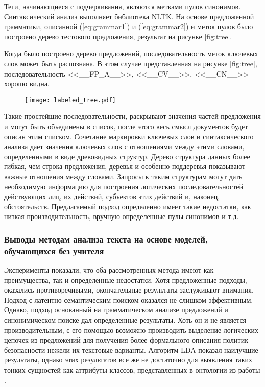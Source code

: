 \documentclass[../main]{subfiles}
\begin{document}
Теги, начинающиеся с подчеркивания, являются метками пулов синонимов. Синтаксический анализ выполняет библиотека NLTK. На основе предложенной грамматики, описанной (\ref{eq:grammar1}) и (\ref{eq:grammar2}) и меток пулов было построено дерево тестового предложения, результат на рисунке \ref{fig:tree}.

Когда было построено дерево предложений, последовательность меток ключевых слов может быть распознана. В этом случае представленная на рисунке \ref{fig:tree}, последовательность <<\_\_FP\_A\_\_>>, <<\_\_CV\_\_>>, <<\_\_CN\_\_>> хорошо видна.

\begin{figure}[H]
    \centering
    {\texttt{[image: labeled\_tree.pdf]}}
    \vspace{-\baselineskip}
\end{figure}

Такие простейшие последовательности, раскрывают значения частей предложения и могут быть объединены в список, после этого весь смысл документов будет описан этим списком. Сочетание маркировки ключевых слов и синтаксического анализа дает значения ключевых слов с отношениями между этими словами, определенными в виде древовидных структур. Дерево структура данных более гибкая, чем строка предложения, деревья и особенно поддеревья показывают важные отношения между словами. Запросы к таким структурам могут дать необходимую информацию для построения логических последовательностей действующих лиц, их действий, субъектов этих действий и, наконец, обстоятельств. Предлагаемый подход определенно имеет такие недостатки, как низкая производительность, вручную определенные пулы синонимов и т.д.

\subsubsection{Выводы методам анализа текста на основе моделей, обучающихся без учителя}

Эксперименты показали, что оба рассмотренных метода имеют как преимущества, так и определенные недостатки. Хотя предложенные подходы, оказались противоречивыми, окончательные результаты заслуживают внимания. Подход с латентно-семантическим поиском оказался не слишком эффективным. Однако, подход основанный на грамматическом анализе предложений и синонимическом поиске дал определенные результаты. Хоть он и не является производительным, с его помощью возможно производить выделение логических цепочек из предложений для получения более формального описания политик безопасности нежели их текстовые варианты. Алгоритм LDA показал наилучшие результаты, однако этих результатов все же не достаточно для выявления таких тонких сущностей как аттрибуты классов, представленных в онтологии из работы \cite{P2Onto}.
\end{document}
